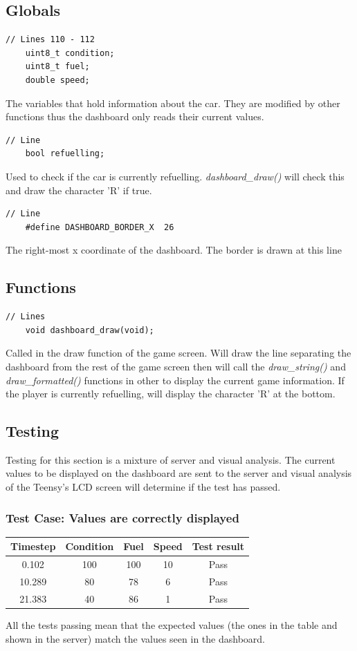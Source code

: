 \documentclass{article}
\begin{document}
\subsection*{Globals}
\begin{lstlisting}[style=CStyle]
	// Lines 110 - 112
	uint8_t condition;
	uint8_t fuel;
	double speed;
\end{lstlisting}
The variables that hold information about the car. They are modified by other functions thus the dashboard only reads their current values.
\begin{lstlisting}[style=CStyle]
	// Line
	bool refuelling;
\end{lstlisting}
Used to check if the car is currently refuelling. \emph{dashboard\_draw()} will check this and draw the character 'R' if true.
\begin{lstlisting}[style=CStyle]
	// Line
	#define DASHBOARD_BORDER_X  26
\end{lstlisting}
The right-most x coordinate of the dashboard. The border is drawn at this line

\subsection*{Functions}
\begin{lstlisting}[style=CStyle]
	// Lines 
	void dashboard_draw(void);
\end{lstlisting}
Called in the draw function of the game screen. Will draw the line separating the dashboard from the rest of the game screen then will call the \emph{draw\_string()} and \emph{draw\_formatted()} functions in other to display the current game information. If the player is currently refuelling, will display the character 'R' at the bottom. 

\subsection*{Testing}
Testing for this section is a mixture of server and visual analysis. The current values to be displayed on the dashboard are sent to the server and visual analysis of the Teensy's LCD screen will determine if the test has passed.
\subsubsection*{Test Case: Values are correctly displayed}
\begin{center}
\begin{tabular}{ c c c c c }
Timestep	& Condition	& Fuel		& Speed	& Test result	\\ \hline
0.102		& 100		& 100		& 10		& Pass	\\
10.289	& 80		& 78		& 6		& Pass	\\ 
21.383	& 40		& 86		& 1		& Pass	\\ \hline
\end{tabular}
\end{center}
All the tests passing mean that the expected values (the ones in the table and shown in the server) match the values seen in the dashboard.
\end{document}
